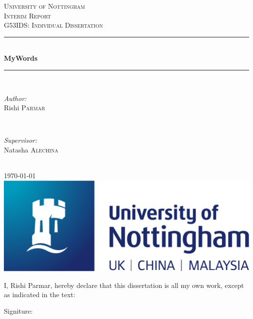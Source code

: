 \begin{titlepage}

\newcommand{\HRule}{\rule{\linewidth}{0.5mm}}

\center 

\textsc{\LARGE University of Nottingham}\\[1.5cm] 
\textsc{\Large Interim Report}\\[0.5cm] 
\textsc{\large G53IDS: Individual Dissertation}\\[0.5cm]
\HRule \\[0.4cm]
{ \huge  \textbf {MyWords}}\\[0.4cm] %
\HRule \\[1.5cm]

\begin{minipage}{0.4\textwidth}
\begin{flushleft} \large
\emph{Author:}\\
Rishi \textsc{Parmar} %
\end{flushleft}
\end{minipage}
~
\begin{minipage}{0.4\textwidth}
\begin{flushright} \large
\emph{Supervisor:} \\
Natasha \textsc{Alechina} %
\end{flushright}
\end{minipage}\\[2cm]
{\large \today}\\[2cm]
\includegraphics[scale=0.5]{images/uon.png}\\[1cm] 

\vspace{1cm}

I, Rishi Parmar, hereby declare that this dissertation is all my own work, except as indicated in the text: \\

\vspace{1cm}

Signiture: \hrulefill

\vfill 

\end{titlepage}